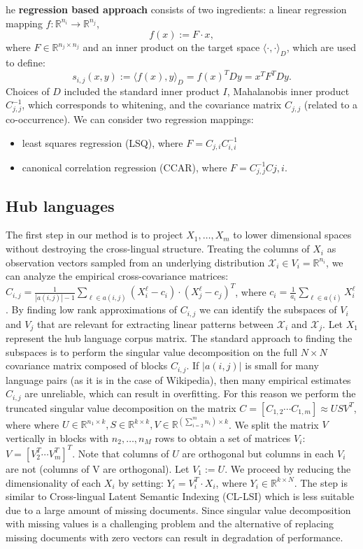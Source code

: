\documentclass[twoside,11pt]{article}
\newcommand{\RR}{\mathbb{R}}
\begin{document}
he \textbf{regression based approach} consists of two ingredients: a linear regression mapping $f : \RR^{n_i} \rightarrow \RR^{n_j}$,$$ f(x) := F\cdot x,$$ where $F \in \RR^{n_j \times n_j}$ and an inner product on the target space $\langle \cdot, \cdot \rangle_D$, which are used to define: 
$$s_{i,j}(x,y) := \langle f(x), y \rangle_D = f(x)^T D y = x^T F^T D y.$$
Choices of $D$ included the standard inner product $I$, Mahalanobis inner product $C_{j,j}^{-1}$, which corresponds to whitening, and the covariance matrix $C_{j,j}$ (related to a co-occurrence). We can consider two regression mappings:
\begin{itemize}
\item least squares regression (LSQ), where $F = C_{j,i}C_{i,i}^{-1}$
\item canonical correlation regression\cite{ccar} (CCAR), where $F = C_{j,j}^{-1}C{j,i}$.
\end{itemize}


\subsection{Hub languages}

The first step in our method is to project $X_1, \ldots, X_m$ to lower dimensional spaces without destroying the cross-lingual structure. Treating the columns of $X_i$ as observation vectors sampled from an underlying distribution $\mathcal{X}_i \in V_i = \RR^{n_i}$, we can analyze the empirical cross-covariance matrices: $C_{i,j} = \frac{1}{|a(i,j)|-1 }\sum_{\ell \in a(i,j)} (X_i^{\ell} - c_i)\cdot (X_j^{\ell} - c_j)^T$, where $c_i = \frac{1}{a_i} \sum_{\ell \in a(i)}X_i^{\ell}$. By finding low rank approximations of $C_{i,j}$ we can identify the subspaces of $V_i$ and $V_j$ that are relevant for extracting linear patterns between $\mathcal{X}_i$ and $\mathcal{X}_j$. Let $X_1$ represent the hub language corpus matrix. The standard approach to finding the subspaces is to perform the singular value decomposition on the full $N \times N$ covariance matrix composed of blocks $C_{i,j}$. If $|a(i,j)|$ is small for many language pairs (as it is in the case of Wikipedia), then many empirical estimates $C_{i,j}$ are unreliable, which can result in overfitting. For this reason we perform the truncated singular value decomposition on the matrix $C = [C_{1,2}  \cdots  C_{1,m}] \approx U S V^T$, where where $U \in \RR^{n_1 \times k}, S \in \RR^{k \times k}, V \in \RR^{(\sum_{i=2}^m n_i) \times k}$. We split the matrix $V$ vertically in blocks with $n_2, \ldots, n_M$ rows to obtain a set of matrices $V_i$: $V = [V_2^T  \cdots  V_m^T]^T$. Note that columns of $U$ are orthogonal but columns in each $V_i$ are not (columns of V are orthogonal). Let $V_1 := U$. We proceed by reducing the dimensionality of each $X_i$ by setting: $Y_i = V_i^T \cdot X_i$, where $Y_i \in \RR^{k\times N}$. The step is similar to Cross-lingual Latent Semantic Indexing (CL-LSI) \cite{lsi}\cite{cl_lsi} which is less suitable due to a large amount of missing documents. Since singular value decomposition with missing values is a challenging problem and the alternative of replacing missing documents with zero vectors can result in degradation of performance.
\end{document}
